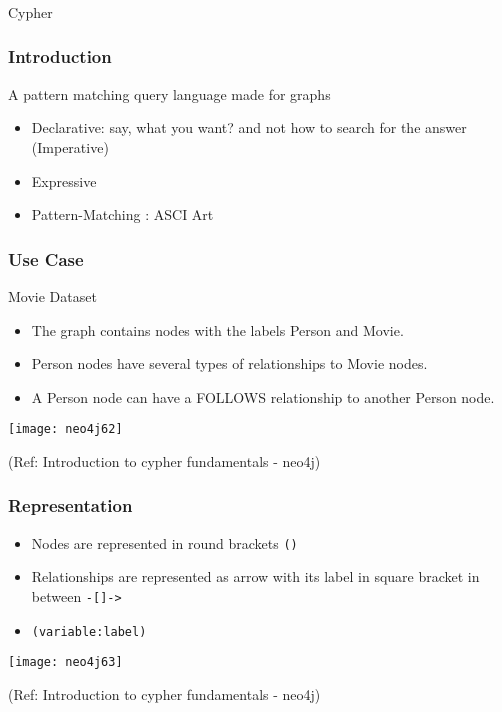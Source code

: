 \begin{frame}[fragile]\frametitle{}
\begin{center}
{\Large Cypher}
\end{center}
\end{frame}


\begin{frame}[fragile]\frametitle{Introduction}
A pattern matching query language made for graphs

\begin{itemize}
\item Declarative: say, what you want? and not how to search for the answer (Imperative)
\item Expressive
\item Pattern-Matching : ASCI Art
\end{itemize}

\end{frame}



\begin{frame}[fragile]\frametitle{Use Case}

Movie Dataset

\begin{itemize}
\item The graph contains nodes with the labels Person and Movie. 
\item Person nodes have several types of relationships to Movie nodes. 
\item A Person node can have a FOLLOWS relationship to another Person node.
\end{itemize}


\begin{center}
\texttt{[image: neo4j62]}
\end{center}	  


{\tiny (Ref: Introduction to cypher fundamentals  - neo4j)}

\end{frame}

\begin{frame}[fragile]\frametitle{Representation}


\begin{itemize}
\item Nodes are represented in round brackets \lstinline|()|
\item Relationships are represented as arrow with its label in square bracket in between \lstinline|-[]->|
\item \lstinline|(variable:label)|
\end{itemize}


\begin{center}
\texttt{[image: neo4j63]}
\end{center}	  


{\tiny (Ref: Introduction to cypher fundamentals  - neo4j)}

\end{frame}

